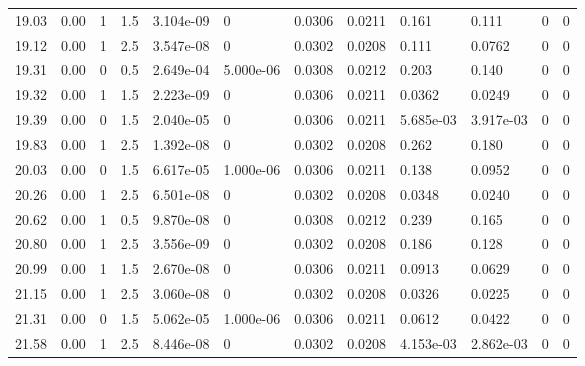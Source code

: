 \documentclass[preview]{standalone}
\begin{document}
{{{{\begin{tabular}{L{1.2cm}C{1.2cm} C{0.3cm}C{0.5cm} C{1.4cm}C{1.4cm} C{1.4cm}C{1.4cm} C{1.6cm}C{1.6cm} C{1.6cm}C{1.6cm}}
  19.03  &  0.00  & 1     & 1.5 &  3.104e-09  & 0  &  0.0306&   0.0211& 0.161 & 0.111   &  0 & 0  \\ 
  19.12  &  0.00  & 1     & 2.5 &  3.547e-08  & 0  &  0.0302&   0.0208& 0.111 & 0.0762   &  0 & 0  \\ 
  19.31  &  0.00  & 0     & 0.5 &  2.649e-04  & 5.000e-06  &  0.0308&   0.0212& 0.203 & 0.140   &  0 & 0  \\ 
  19.32  &  0.00  & 1     & 1.5 &  2.223e-09  & 0  &  0.0306&   0.0211& 0.0362 & 0.0249   &  0 & 0  \\ 
  19.39  &  0.00  & 0     & 1.5 &  2.040e-05  & 0  &  0.0306&   0.0211& 5.685e-03 & 3.917e-03   &  0 & 0  \\ 
  19.83  &  0.00  & 1     & 2.5 &  1.392e-08  & 0  &  0.0302&   0.0208& 0.262 & 0.180   &  0 & 0  \\ 
  20.03  &  0.00  & 0     & 1.5 &  6.617e-05  & 1.000e-06  &  0.0306&   0.0211& 0.138 & 0.0952   &  0 & 0  \\ 
  20.26  &  0.00  & 1     & 2.5 &  6.501e-08  & 0  &  0.0302&   0.0208& 0.0348 & 0.0240   &  0 & 0  \\ 
  20.62  &  0.00  & 1     & 0.5 &  9.870e-08  & 0  &  0.0308&   0.0212& 0.239 & 0.165   &  0 & 0  \\ 
  20.80  &  0.00  & 1     & 2.5 &  3.556e-09  & 0  &  0.0302&   0.0208& 0.186 & 0.128   &  0 & 0  \\ 
  20.99  &  0.00  & 1     & 1.5 &  2.670e-08  & 0  &  0.0306&   0.0211& 0.0913 & 0.0629   &  0 & 0  \\ 
  21.15  &  0.00  & 1     & 2.5 &  3.060e-08  & 0  &  0.0302&   0.0208& 0.0326 & 0.0225   &  0 & 0  \\ 
  21.31  &  0.00  & 0     & 1.5 &  5.062e-05  & 1.000e-06  &  0.0306&   0.0211& 0.0612 & 0.0422   &  0 & 0  \\ 
  21.58  &  0.00  & 1     & 2.5 &  8.446e-08  & 0  &  0.0302&   0.0208& 4.153e-03 & 2.862e-03   &  0 & 0  \\ 
\hline 
\end{tabular} 

}}}}
\end{document}
